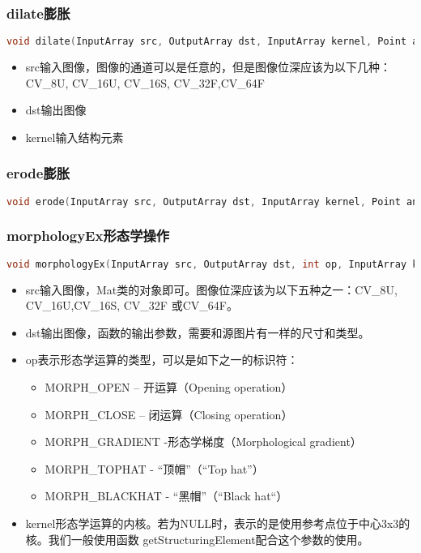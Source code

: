 \documentclass[12pt]{article}
\begin{document}
\subsubsection{dilate膨胀}
\begin{lstlisting}[language=c++]
void dilate(InputArray src, OutputArray dst, InputArray kernel, Point anchor=Point(-1,-1), int iterations=1, int borderType=BORDER_CONSTANT, const Scalar& borderValue=morphologyDefaultBorderValue() )
\end{lstlisting}
\begin{itemize}
\item src输入图像，图像的通道可以是任意的，但是图像位深应该为以下几种：CV\_8U, CV\_16U, CV\_16S, CV\_32F,CV\_64F
\item dst输出图像
\item kernel输入结构元素
\end{itemize}

\subsubsection{erode膨胀}
\begin{lstlisting}[language=C++]
void erode(InputArray src, OutputArray dst, InputArray kernel, Point anchor=Point(-1,-1), int iterations=1, int borderType=BORDER_CONSTANT, const Scalar& borderValue=morphologyDefaultBorderValue() )
\end{lstlisting}

\subsubsection{morphologyEx形态学操作}
\begin{lstlisting}[language=c++]
void morphologyEx(InputArray src, OutputArray dst, int op, InputArray kernel, Point anchor=Point(-1,-1), int iterations=1, int borderType=BORDER_CONSTANT, const Scalar& borderValue=morphologyDefaultBorderValue() )
\end{lstlisting}
\begin{itemize}
\item src输入图像，Mat类的对象即可。图像位深应该为以下五种之一：CV\_8U, CV\_16U,CV\_16S, CV\_32F 或CV\_64F。
\item dst输出图像，函数的输出参数，需要和源图片有一样的尺寸和类型。
\item op表示形态学运算的类型，可以是如下之一的标识符：
	\begin{itemize}
	\item MORPH\_OPEN – 开运算（Opening operation）
	\item MORPH\_CLOSE – 闭运算（Closing operation）
	\item MORPH\_GRADIENT -形态学梯度（Morphological gradient）
	\item MORPH\_TOPHAT - “顶帽”（“Top hat”）
	\item MORPH\_BLACKHAT - “黑帽”（“Black hat“）
	\end{itemize}
\item kernel形态学运算的内核。若为NULL时，表示的是使用参考点位于中心3x3的核。我们一般使用函数 getStructuringElement配合这个参数的使用。
\end{itemize}
\end{document}
